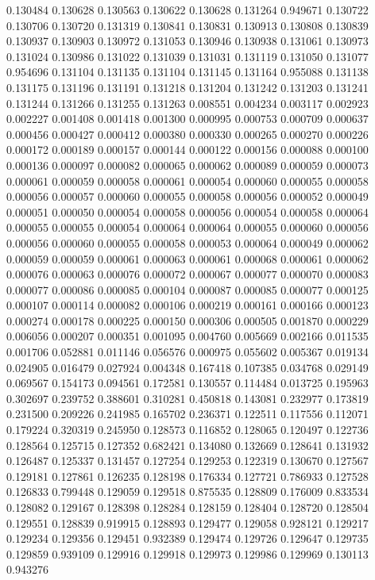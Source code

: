 0.130484
0.130628
0.130563
0.130622
0.130628
0.131264
0.949671
0.130722
0.130706
0.130720
0.131319
0.130841
0.130831
0.130913
0.130808
0.130839
0.130937
0.130903
0.130972
0.131053
0.130946
0.130938
0.131061
0.130973
0.131024
0.130986
0.131022
0.131039
0.131031
0.131119
0.131050
0.131077
0.954696
0.131104
0.131135
0.131104
0.131145
0.131164
0.955088
0.131138
0.131175
0.131196
0.131191
0.131218
0.131204
0.131242
0.131203
0.131241
0.131244
0.131266
0.131255
0.131263
0.008551
0.004234
0.003117
0.002923
0.002227
0.001408
0.001418
0.001300
0.000995
0.000753
0.000709
0.000637
0.000456
0.000427
0.000412
0.000380
0.000330
0.000265
0.000270
0.000226
0.000172
0.000189
0.000157
0.000144
0.000122
0.000156
0.000088
0.000100
0.000136
0.000097
0.000082
0.000065
0.000062
0.000089
0.000059
0.000073
0.000061
0.000059
0.000058
0.000061
0.000054
0.000060
0.000055
0.000058
0.000056
0.000057
0.000060
0.000055
0.000058
0.000056
0.000052
0.000049
0.000051
0.000050
0.000054
0.000058
0.000056
0.000054
0.000058
0.000064
0.000055
0.000055
0.000054
0.000064
0.000064
0.000055
0.000060
0.000056
0.000056
0.000060
0.000055
0.000058
0.000053
0.000064
0.000049
0.000062
0.000059
0.000059
0.000061
0.000063
0.000061
0.000068
0.000061
0.000062
0.000076
0.000063
0.000076
0.000072
0.000067
0.000077
0.000070
0.000083
0.000077
0.000086
0.000085
0.000104
0.000087
0.000085
0.000077
0.000125
0.000107
0.000114
0.000082
0.000106
0.000219
0.000161
0.000166
0.000123
0.000274
0.000178
0.000225
0.000150
0.000306
0.000505
0.001870
0.000229
0.006056
0.000207
0.000351
0.001095
0.004760
0.005669
0.002166
0.011535
0.001706
0.052881
0.011146
0.056576
0.000975
0.055602
0.005367
0.019134
0.024905
0.016479
0.027924
0.004348
0.167418
0.107385
0.034768
0.029149
0.069567
0.154173
0.094561
0.172581
0.130557
0.114484
0.013725
0.195963
0.302697
0.239752
0.388601
0.310281
0.450818
0.143081
0.232977
0.173819
0.231500
0.209226
0.241985
0.165702
0.236371
0.122511
0.117556
0.112071
0.179224
0.320319
0.245950
0.128573
0.116852
0.128065
0.120497
0.122736
0.128564
0.125715
0.127352
0.682421
0.134080
0.132669
0.128641
0.131932
0.126487
0.125337
0.131457
0.127254
0.129253
0.122319
0.130670
0.127567
0.129181
0.127861
0.126235
0.128198
0.176334
0.127721
0.786933
0.127528
0.126833
0.799448
0.129059
0.129518
0.875535
0.128809
0.176009
0.833534
0.128082
0.129167
0.128398
0.128284
0.128159
0.128404
0.128720
0.128504
0.129551
0.128839
0.919915
0.128893
0.129477
0.129058
0.928121
0.129217
0.129234
0.129356
0.129451
0.932389
0.129474
0.129726
0.129647
0.129735
0.129859
0.939109
0.129916
0.129918
0.129973
0.129986
0.129969
0.130113
0.943276
